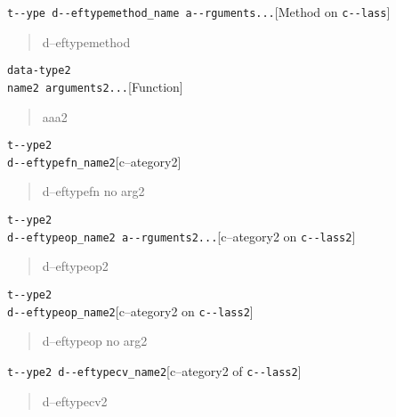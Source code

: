 \documentclass{book}
\begin{document}
\begin{titlepage}
\noindent\texttt{t{-}{-}ype d{-}{-}eftypemethod\_name a{-}{-}rguments...}\hfill[Method on \texttt{c{-}{-}lass}]

%
\begin{quote}
\unskip{\parskip=0pt\noindent}%
d--eftypemethod
\end{quote}


\noindent\texttt{data-type2\leavevmode{}\\name2 arguments2...}\hfill[Function]

%
\begin{quote}
\unskip{\parskip=0pt\noindent}%
aaa2
\end{quote}

\noindent\texttt{t{-}{-}ype2\leavevmode{}\\d{-}{-}eftypefn\_name2}\hfill[c--ategory2]

%
\begin{quote}
\unskip{\parskip=0pt\noindent}%
d--eftypefn no arg2
\end{quote}

\noindent\texttt{t{-}{-}ype2\leavevmode{}\\d{-}{-}eftypeop\_name2 a{-}{-}rguments2...}\hfill[c--ategory2 on \texttt{c{-}{-}lass2}]

%
\begin{quote}
\unskip{\parskip=0pt\noindent}%
d--eftypeop2
\end{quote}

\noindent\texttt{t{-}{-}ype2\leavevmode{}\\d{-}{-}eftypeop\_name2}\hfill[c--ategory2 on \texttt{c{-}{-}lass2}]

%
\begin{quote}
\unskip{\parskip=0pt\noindent}%
d--eftypeop no arg2
\end{quote}

\noindent\texttt{t{-}{-}ype2 d{-}{-}eftypecv\_name2}\hfill[c--ategory2 of \texttt{c{-}{-}lass2}]

%
\begin{quote}
\unskip{\parskip=0pt\noindent}%
d--eftypecv2
\end{quote}


\end{titlepage}
\end{document}
